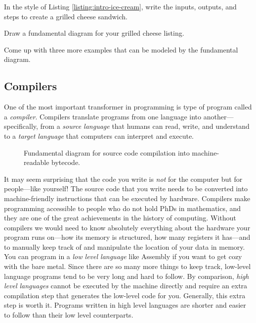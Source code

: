 \begin{question}
  In the style of Listing \ref{listing:intro-ice-cream}, write the inputs, outputs, and steps to create a grilled cheese sandwich.
\end{question}

\begin{question}
  Draw a fundamental diagram for your grilled cheese listing.
\end{question}

\begin{question}
  Come up with three more examples that can be modeled by the fundamental diagram.
\end{question}

\subsection{Compilers} One of the most important transformer in programming is type of program called a \emph{compiler}. Compilers translate programs from one language into another---specifically, from a \emph{source language} that humans can read, write, and understand to a \emph{target language} that computers can interpret and execute.

\begin{figure}[h]
  
  \caption{\label{fig:intro-example-compiler} Fundamental diagram for source code compilation into machine-readable bytecode.}
\end{figure}

It may seem surprising that the code you write is \emph{not} for the computer but for people---like yourself! The source code that you write needs to be converted into machine-friendly instructions that can be executed by hardware. Compilers make programming accessible to people who do not hold PhDs in mathematics, and they are one of the great achievements in the history of computing. Without compilers we would need to know absolutely everything about the hardware your program runs on---how its memory is structured, how many registers it has---and to manually keep track of and manipulate the location of your data in memory. You can program in a \emph{low level language} like Assembly if you want to get cozy with the bare metal. Since there are so many more things to keep track, low-level language programs tend to be very long and hard to follow. By comparison, \emph{high level languages} cannot be executed by the machine directly and require an extra compilation step that generates the low-level code for you. Generally, this extra step is worth it. Programs written in high level languages are shorter and easier to follow than their low level counterparts.

